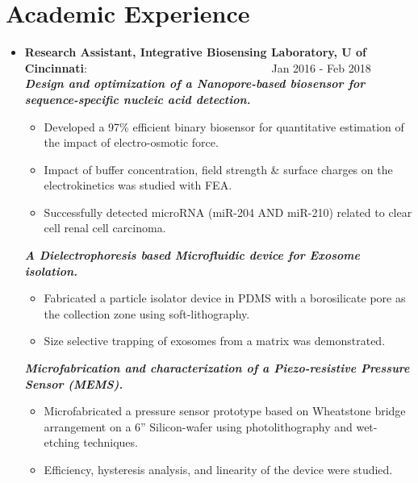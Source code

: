 \documentclass[a4paper,20pt]{article}
\newcommand{\resumeItem}[2]{
  \item\small{
    \textbf{#1}{: #2 \vspace{-2pt}}
  }
}
\newcommand{\resumeSubItem}[2]{\resumeItem{#1}{#2}\vspace{-3pt}}
\newcommand{\resumeSubHeadingListStart}{\begin{itemize}[leftmargin=*]}
\newcommand{\resumeSubHeadingListEnd}{\end{itemize}}
\begin{document}
\section{Academic Experience}
  \resumeSubHeadingListStart
    \resumeSubItem
      {Research Assistant, Integrative Biosensing Laboratory, U of Cincinnati}{~~~~~~~~~~~~~~~~~~~~~~~~~~~~~~~~Jan 2016 - Feb 2018}\\
      \vspace{10pt}
      {\textbf {\textit{Design and optimization of a Nanopore-based biosensor for sequence-specific nucleic acid detection.}}}{}
      \begin{itemize}[leftmargin=*]
      \vspace{-5pt}
      \setlength\itemsep{-0.1em}
        \item Developed a 97\%  efficient binary biosensor for quantitative estimation of the impact of electro-osmotic force.
         \item Impact of buffer concentration, field strength \& surface charges on the electrokinetics was studied with FEA.
         \item Successfully detected microRNA (miR-204 AND miR-210) related to clear cell renal cell carcinoma.
        \end{itemize}
       {\textbf{\textit {A Dielectrophoresis based Microfluidic device for Exosome isolation.}}}{}
        \begin{itemize}[leftmargin=*]
        \vspace{-5pt}
      \setlength\itemsep{-0.1em}
        \item Fabricated a particle isolator device in PDMS with a borosilicate pore as the collection zone using soft-lithography.
         \item Size selective trapping of exosomes from a matrix was demonstrated.
        \end{itemize}
        {\textbf {\textit{Microfabrication and characterization of a Piezo-resistive Pressure Sensor (MEMS).}}}{}
        \begin{itemize}[leftmargin=*]
        \vspace{-5pt}
      \setlength\itemsep{-0.1em}
        \item Microfabricated a pressure sensor prototype based on Wheatstone bridge arrangement on a 6” Silicon-wafer using photolithography and wet-etching techniques.
         \item Efficiency, hysteresis analysis, and linearity of the device were studied.
        \end{itemize}
    \resumeSubHeadingListEnd
    
\end{document}
